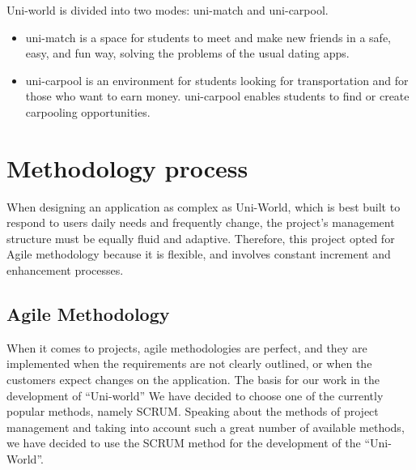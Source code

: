 Uni-world is divided into two modes: uni-match and uni-carpool.
\begin{itemize}
\item uni-match is a space for students to meet and make new friends in a safe, easy, and fun way, solving the problems of the usual dating apps.
\item uni-carpool is an environment for students looking for transportation and for those who want to earn money. uni-carpool enables students to find or create carpooling opportunities.
\end{itemize}


\section{Methodology process}

When designing an application as complex as Uni-World, which is best built to respond to users daily needs and frequently change, the project’s management structure must be equally fluid and adaptive. Therefore, this project opted for Agile methodology because it is flexible, and involves constant increment and enhancement processes. 
\subsection{Agile Methodology}
When it comes to projects, agile methodologies are perfect, and they are implemented when the requirements are not clearly outlined, or when the customers expect changes on the application. The basis for our work in the development of “Uni-world” We have decided to choose one of the currently popular methods, namely SCRUM.
Speaking about the methods of project management and taking into account such a great number of available methods, we have decided to use the SCRUM method for the development of the “Uni-World”. \\

